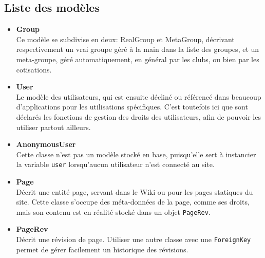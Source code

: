 \documentclass[a4paper]{report}
\begin{document}
\subsection{Liste des modèles}
\label{sub:liste_des_mod_les}
\begin{itemize}
    \item \textbf{Group} \\
        Ce modèle se subdivise en deux: RealGroup et MetaGroup, décrivant respectivement un vrai groupe géré à la main
        dans la liste des groupes, et un meta-groupe, géré automatiquement, en général par les clubs, ou bien par les
        cotisations.
    \item \textbf{User} \\
        Le modèle des utilisateurs, qui est ensuite décliné ou référencé dans beaucoup d'applications pour les
        utilisations spécifiques. C'est toutefois ici que sont déclarés les fonctions de gestion des droits des
        utilisateurs, afin de pouvoir les utiliser partout ailleurs.
    \item \textbf{AnonymousUser} \\
        Cette classe n'est pas un modèle stocké en base, puisqu'elle sert à instancier la variable \verb#user#
        lorsqu'aucun utilisateur n'est connecté au site.
    \item \textbf{Page} \\
        Décrit une entité page, servant dans le Wiki ou pour les pages statiques du site. Cette classe s'occupe des
        méta-données de la page, comme ses droits, mais son contenu est en réalité stocké dans un objet \verb#PageRev#.
    \item \textbf{PageRev} \\
        Décrit une révision de page. Utiliser une autre classe avec une \verb#ForeignKey# permet de gérer facilement un
        historique des révisions.
\end{itemize}
\end{document}

